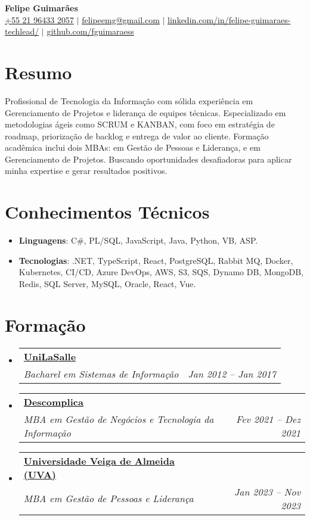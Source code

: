 \documentclass[letterpaper,10pt]{article}
\makeatletter
\newcommand{\resumeItem}[1]{\item\small{#1}}
\newcommand{\resumeSubheading}[4]{
\vspace{-1pt}\item
  \begin{tabular*}{0.97\textwidth}[t]{l@{\extracolsep{\fill}}r}
    \textbf{#1} & #2 \\
    \textit{#3} & \textit{#4} \\
  \end{tabular*}\vspace{-7pt}
}
\newcommand{\resumeSubHeadingList}{\begin{itemize}[leftmargin=0.15in, label={}]}
\newcommand{\resumeSubHeadingListEnd}{\end{itemize}}
\makeatother
\begin{document}
\begin{center}
  \textbf{\Huge Felipe Guimarães} \\
  \small 
  \href{tel:+5521964332057}{+55 21 96433 2057} $|$ 
  \href{mailto:felipeemg@gmail.com}{felipeemg@gmail.com} $|$ 
  \href{https://linkedin.com/in/felipe-guimaraes-techlead}{linkedin.com/in/felipe-guimaraes-techlead/} $|$
  \href{https://github.com/fguimaraess}{github.com/fguimaraess}
\end{center}

\section*{Resumo}
Profissional de Tecnologia da Informação com sólida experiência em Gerenciamento de Projetos e liderança de equipes técnicas. Especializado em metodologias ágeis como SCRUM e KANBAN, com foco em estratégia de roadmap, priorização de backlog e entrega de valor ao cliente. Formação acadêmica inclui dois MBAs: em Gestão de Pessoas e Liderança, e em Gerenciamento de Projetos. Buscando oportunidades desafiadoras para aplicar minha expertise e gerar resultados positivos.

\section{Conhecimentos Técnicos}
\resumeSubHeadingList
  \resumeItem{\textbf{Linguagens}: C\#, PL/SQL, JavaScript, Java, Python, VB, ASP.}
  \resumeItem{\textbf{Tecnologias}: .NET, TypeScript, React, PostgreSQL, Rabbit MQ, Docker, Kubernetes, CI/CD, Azure DevOps, AWS, S3, SQS, Dynamo DB, MongoDB, Redis, SQL Server, MySQL, Oracle, React, Vue.}
\resumeSubHeadingListEnd

\section{Formação}
\resumeSubHeadingList
  \resumeSubheading
      {\href{https://www.unilasalle.edu.br/vestibular/rj}{UniLaSalle}}{}
      {Bacharel em Sistemas de Informação}{Jan 2012 -- Jan 2017}
  \resumeSubheading
      {\href{https://descomplica.com.br/pos-graduacao/}{Descomplica}}{}
      {MBA em Gestão de Negócios e Tecnologia da Informação}{Fev 2021 -- Dez 2021}
  \resumeSubheading
      {\href{https://online.uva.br/}{Universidade Veiga de Almeida (UVA)}}{}
      {MBA em Gestão de Pessoas e Liderança}{Jan 2023 -- Nov 2023}
\resumeSubHeadingListEnd
\end{document}
